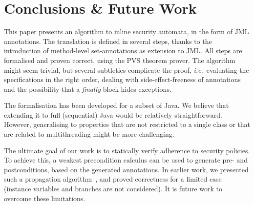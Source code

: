 \section{Conclusions \& Future Work }\label{SecConcl}

This paper presents an algorithm to inline security automata, in the
form of JML annotations. The translation is defined in several steps,
thanks to the introduction of method-level set-annotations as
extension to JML. All steps are formalised and proven correct, using
the PVS theorem prover. The algorithm might seem trivial, but several
subtleties complicate the proof, \emph{i.e.}~evaluating the
specifications in the right order, dealing with side-effect-freeness
of annotations and the possibility that a
\emph{finally} block hides exceptions. 


The formalisation has been developed for a subset of Java. We believe
that extending it to full (sequential) Java would be relatively
straightforward. However, generalising to properties that are not
restricted to a single class or that are related to multithreading
might be more challenging.

The ultimate goal of our work is to statically verify adherence to
security policies. 
To achieve this, a weakest precondition calculus can
be used to generate pre- and postconditions, 
based on the generated
\Set annotations. 
In earlier work, we presented such a propagation
algorithm~\cite{PavlovaBBHL04}, and proved correctness for a limited
case (instance variables and branches are not considered). It is
future work to overcome these limitations.
